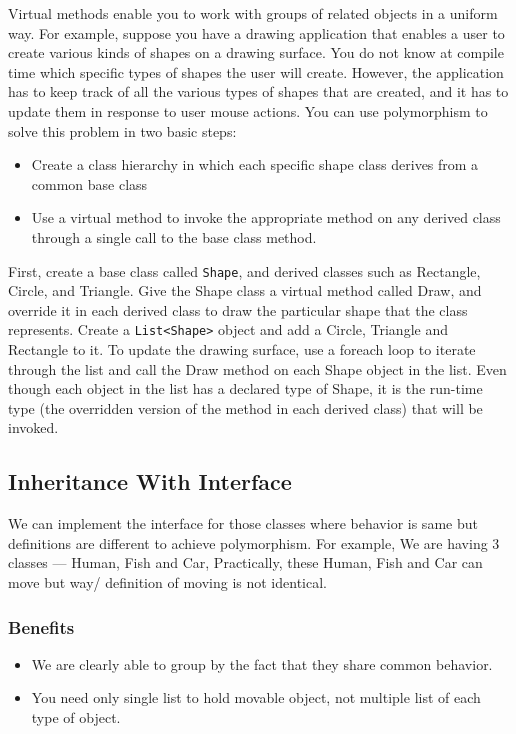 Virtual methods enable you to work with groups of related objects in a uniform way. For
example, suppose you have a drawing application that enables a user to create various
kinds of shapes on a drawing surface. You do not know at compile time which specific
types of shapes the user will create. However, the application has to keep track of all the
various types of shapes that are created, and it has to update them in response to user
mouse actions. You can use polymorphism to solve this problem in two basic steps:

\begin{itemize}
	\item Create a class hierarchy in which each specific shape class derives from a
	common base class
	\item Use a virtual method to invoke the appropriate method on any derived class
	through a single call to the base class method.
\end{itemize}

First, create a base class called \texttt{Shape}, and derived classes such
as Rectangle, Circle, and Triangle. Give the Shape class a virtual method
called Draw, and override it in each derived class to draw the particular shape that the
class represents. Create a \texttt{List<Shape>} object and add a Circle, Triangle and Rectangle
to it. To update the drawing surface, use a foreach loop to iterate through the list and call
the Draw method on each Shape object in the list. Even though each object in the list has
a declared type of Shape, it is the run-time type (the overridden version of the method in
each derived class) that will be invoked.



\subsection*{Inheritance With Interface}
We can implement the interface for those classes where behavior is same but
definitions are different to achieve polymorphism. For example, We are having 3
classes — Human, Fish and Car, Practically, these Human, Fish and Car can move but way/
definition of moving is not identical.

\subsubsection*{Benefits}
\begin{itemize}
	\item We are clearly able to group by the fact that they share common behavior.
	\item You need only single list to hold movable object, not multiple list of each type of object.
\end{itemize}


\newpage\thispagestyle{empty}
